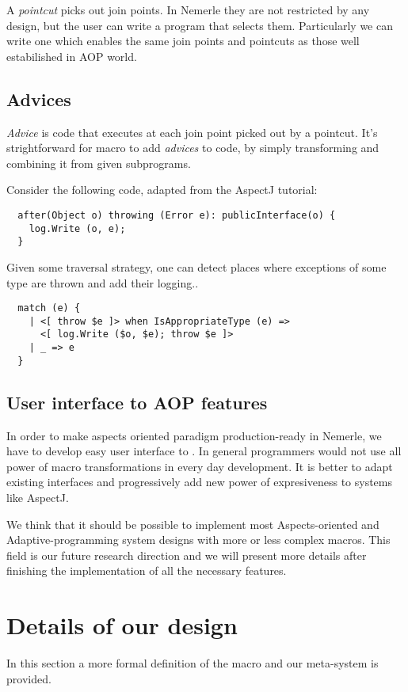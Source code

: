\documentclass{llncs}
\begin{document}
A \emph{pointcut} picks out join points. In Nemerle they are not
restricted by any design, but the user can write a program that selects them.
Particularly we can write one which enables the same join points and pointcuts 
as those well estabilished in AOP world.

\subsection{Advices}
\emph{Advice} is code that executes at each join point picked out by a pointcut.
It's strightforward for macro to add \emph{advices} to code, by simply transforming
and combining it from given subprograms.

Consider the following code, adapted from the AspectJ tutorial: 

\begin{verbatim}
  after(Object o) throwing (Error e): publicInterface(o) {
    log.Write (o, e);
  }
\end{verbatim}

Given some traversal strategy, one can detect places where exceptions of some
type are thrown and add their logging..

\begin{verbatim}
  match (e) {
    | <[ throw $e ]> when IsAppropriateType (e) =>
      <[ log.Write ($o, $e); throw $e ]>
    | _ => e
  }
\end{verbatim}

\subsection{User interface to AOP features}
In order to make aspects oriented paradigm production-ready in Nemerle, we have
to develop easy user interface to . In general programmers would not use all power
of macro transformations in every day development. It is better to adapt existing
interfaces and progressively add new power of expresiveness to systems like AspectJ.

We think that it should be possible to implement most Aspects-oriented
and Adaptive-programming system designs with more or less complex 
macros. This field is our future research direction and we will present
more details after finishing the implementation of all the necessary features.

\section{Details of our design}
In this section a more formal definition of the macro and our meta-system is provided.
\end{document}
